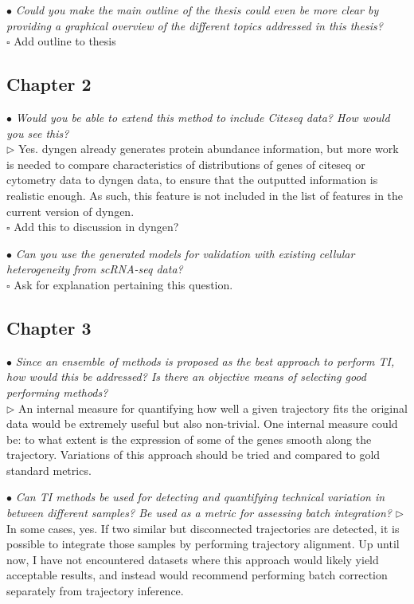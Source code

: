 \documentclass[10pt]{article}
\newcommand{\todo}{$\square$}
\newcommand{\exam}[2][\  ]{\hspace{0pt}\marginpar{\color{myred}#1}$\bullet$ \textit{#2}}
\newcommand{\answ}[1]{{\color{myblue} $\triangleright$ #1}}
\newcommand{\task}[2][\todo]{{\color{myblue} #1 #2}}
\begin{document}
\exam{Could you make the main outline of the thesis could even be more clear by
	providing a graphical overview of the different topics addressed in this thesis?} \\
\task{Add outline to thesis}

\subsection{Chapter 2}
\exam{Would you be able to extend this method to include Citeseq data? How would
	you see this?}\\
\answ{Yes. dyngen already generates protein abundance information, but more work is needed to compare characteristics of distributions of genes of citeseq or cytometry data to dyngen data, to ensure that the outputted information is realistic enough. As such, this feature is not included in the list of features in the current version of dyngen.} \\
\task{Add this to discussion in dyngen?}

\exam{Can you use the generated models for validation with existing cellular
	heterogeneity from scRNA-seq data?} \\
\task{Ask for explanation pertaining this question.}

\subsection{Chapter 3}

\exam{Since an ensemble of methods is proposed as the best approach to perform TI,
	how would this be addressed? Is there an objective means of selecting good performing
	methods?} \\
\answ{An internal measure for quantifying how well a given trajectory fits the original data would be extremely useful but also non-trivial. One internal measure could be: to what extent is the expression of some of the genes smooth along the trajectory. Variations of this approach should be tried and compared to gold standard metrics.}

\exam{Can TI methods be used for detecting and quantifying technical variation in
	between different samples? Be used as a metric for assessing batch integration?}
\answ{In some cases, yes. If two similar but disconnected trajectories are detected, it is possible to integrate those samples by performing trajectory alignment. Up until now, I have not encountered datasets where this approach would likely yield acceptable results, and instead would recommend performing batch correction separately from trajectory inference.}
\end{document}
